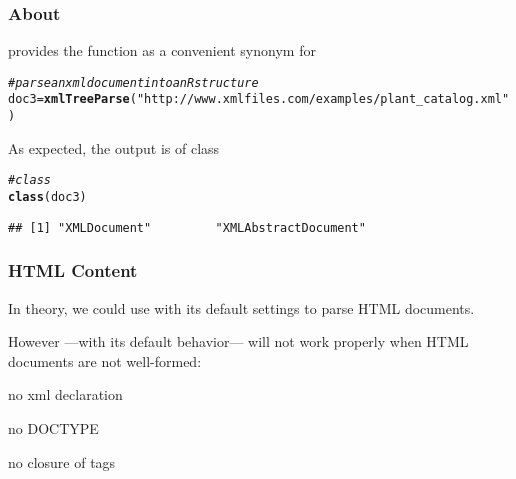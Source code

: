 \documentclass[12pt]{beamer}\usepackage[]{graphicx}\usepackage[]{color}
\makeatletter
\newcommand{\hlstr}[1]{\textcolor[rgb]{0.192,0.494,0.8}{#1}}%
\newcommand{\hlcom}[1]{\textcolor[rgb]{0.678,0.584,0.686}{\textit{#1}}}%
\newcommand{\hlstd}[1]{\textcolor[rgb]{0.345,0.345,0.345}{#1}}%
\newcommand{\hlkwb}[1]{\textcolor[rgb]{0.69,0.353,0.396}{#1}}%
\newcommand{\hlkwd}[1]{\textcolor[rgb]{0.737,0.353,0.396}{\textbf{#1}}}%
\newenvironment{kframe}{%
 \def\at@end@of@kframe{}%
 \ifinner\ifhmode%
  \def\at@end@of@kframe{\end{minipage}}%
  \begin{minipage}{\columnwidth}%
 \fi\fi%
 \def\FrameCommand##1{\hskip\@totalleftmargin \hskip-\fboxsep
 \colorbox{shadecolor}{##1}\hskip-\fboxsep
     \hskip-\linewidth \hskip-\@totalleftmargin \hskip\columnwidth}%
 \MakeFramed {\advance\hsize-\width
   \@totalleftmargin\z@ \linewidth\hsize
   \@setminipage}}%
 {\par\unskip\endMakeFramed%
 \at@end@of@kframe}
\newenvironment{knitrout}{}{} %
\makeatother
\begin{document}

\begin{frame}[fragile]
\frametitle{About }

 provides the function {\hilit {}} as a convenient synonym for 

\begin{knitrout}\scriptsize
{}\color{fgcolor}\begin{kframe}
\begin{alltt}
\hlcom{# parse an xml document into an R structure}
\hlstd{doc3} \hlkwb{=} \hlkwd{xmlTreeParse}\hlstd{(}\hlstr{"http://www.xmlfiles.com/examples/plant_catalog.xml"}\hlstd{)}
\end{alltt}
\end{kframe}
\end{knitrout}

As expected, the output is of class {\hilit {}}

\begin{knitrout}\footnotesize
{}\color{fgcolor}\begin{kframe}
\begin{alltt}
\hlcom{# class }
\hlkwd{class}\hlstd{(doc3)}
\end{alltt}
\begin{verbatim}
## [1] "XMLDocument"         "XMLAbstractDocument"
\end{verbatim}
\end{kframe}
\end{knitrout}
\eb

\end{frame}


\begin{frame}[fragile]
\frametitle{HTML Content}

In theory, we could use {\hilit {}} with its default settings to parse HTML documents. 

\bigskip
However  ---with its default behavior--- will not work properly when HTML documents are not well-formed:
\bi
 \item no xml declaration
 \item no DOCTYPE
 \item no closure of tags
\ei
\eb

\end{frame}
\end{document}
